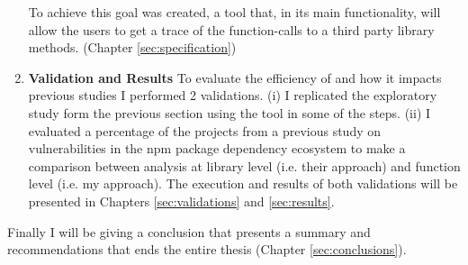\begin{enumerate}
    To achieve this goal \tool[] was created,
    a tool that, in its main functionality, will allow the users to get a trace of the function-calls to a third party library methods.
    (Chapter \ref{sec:specification})
    \item \textbf{Validation and Results} 
    To evaluate the efficiency of \tool[] and how it impacts previous studies I performed 2 validations. (i) I replicated the exploratory study form the previous section using the tool in some of the steps.
    (ii) I evaluated a percentage of the projects from a previous study on vulnerabilities in the npm package dependency ecosystem \cite{decan2018impact} to make a comparison between analysis at library level (i.e. their approach) and function level (i.e. my approach).
    The execution and results of both validations will be presented in Chapters \ref{sec:validations} and \ref{sec:results}.
\end{enumerate}


Finally I will be giving a conclusion that presents a summary and recommendations that ends the entire thesis (Chapter \ref{sec:conclusions}).